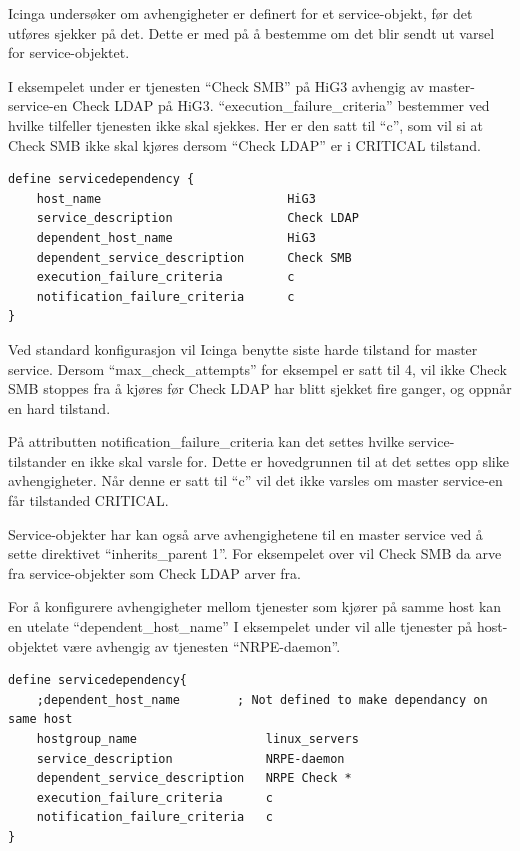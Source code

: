 Icinga undersøker om avhengigheter er definert for et service-objekt, før det utføres sjekker på det. Dette er med på å bestemme om det blir sendt ut varsel for service-objektet.

\clearpage
I eksempelet under er tjenesten ``Check SMB'' på HiG3 avhengig av master-service-en Check LDAP på HiG3. ``execution\_failure\_criteria'' bestemmer ved hvilke tilfeller tjenesten ikke skal sjekkes. Her er den satt til ``c'', som vil si at Check SMB ikke skal kjøres dersom ``Check LDAP'' er i CRITICAL tilstand.

\begin{lstlisting}[style=example]
define servicedependency {
    host_name                          HiG3
    service_description                Check LDAP
    dependent_host_name                HiG3
    dependent_service_description      Check SMB
    execution_failure_criteria         c
    notification_failure_criteria      c
}
\end{lstlisting}

Ved standard konfigurasjon vil Icinga benytte siste harde tilstand for master service. Dersom ``max\_check\_attempts'' for eksempel er satt til 4, vil ikke Check SMB stoppes fra å kjøres før Check LDAP har blitt sjekket fire ganger, og oppnår en hard tilstand. 

På attributten notification\_failure\_criteria kan det settes hvilke service-tilstander en ikke skal varsle for. Dette er hovedgrunnen til at det settes opp slike avhengigheter. Når denne er satt til ``c'' vil det ikke varsles om master service-en får tilstanded CRITICAL.

Service-objekter har kan også arve avhengighetene til en master service ved å sette direktivet ``inherits\_parent 1''. For eksempelet over vil Check SMB da arve fra service-objekter som Check LDAP arver fra.

For å konfigurere avhengigheter mellom tjenester som kjører på samme host kan en utelate ``dependent\_host\_name'' I eksempelet under vil alle tjenester på host-objektet være avhengig av tjenesten ``NRPE-daemon''.

\begin{lstlisting}[style=example]
define servicedependency{
    ;dependent_host_name   	    ; Not defined to make dependancy on same host            
    hostgroup_name 		            linux_servers
    service_description             NRPE-daemon
    dependent_service_description   NRPE Check *
    execution_failure_criteria      c
    notification_failure_criteria   c
}
\end{lstlisting}

